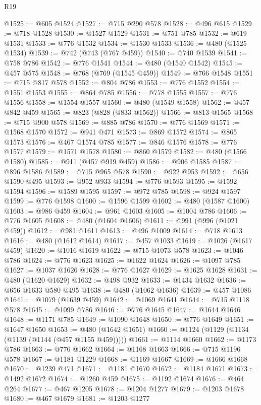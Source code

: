 \begin{lexlean}{R19}
\begin{coremodule}
@1525 := @605 @1524
@1527 := @715 @290 @578
@1528 := @496 @615
@1529 := @718 @1528
@1530 := @1527 @1529
@1531 := @751 @785
@1532 := @619 @1531
@1533 := @776 @1532
@1534 := @1530 @1533
@1536 := @480 (@1525 @1534)
@1539 := @742 (@743 (@767 @459))
@1540 := @740 @1539
@1541 := @758 @786
@1542 := @776 @1541
@1544 := @480 (@1540 @1542)
@1545 := @457 @575
@1548 := @768 (@769 (@1545 @459))
@1549 := @766 @1548
@1551 := @715 @817 @578
@1552 := @804 @786
@1553 := @776 @1552
@1554 := @1551 @1553
@1555 := @864 @785
@1556 := @778 @1555
@1557 := @776 @1556
@1558 := @1554 @1557
@1560 := @480 (@1549 @1558)
@1562 := @457 @842 @459
@1565 := @823 (@828 (@833 @1562))
@1566 := @813 @1565
@1568 := @715 @900 @578
@1569 := @885 @786
@1570 := @776 @1569
@1571 := @1568 @1570
@1572 := @941 @471
@1573 := @869 @1572
@1574 := @865 @1573
@1576 := @467 @1574 @785
@1577 := @846 @1576
@1578 := @776 @1577
@1579 := @1571 @1578
@1580 := @860 @1579
@1582 := @480 (@1566 @1580)
@1585 := @911 (@457 @919 @459)
@1586 := @906 @1585
@1587 := @896 @1586
@1589 := @715 @965 @578
@1590 := @922 @953
@1592 := @656 @1590 @495
@1593 := @952 @933
@1594 := @776 @1593
@1595 := @1592 @1594
@1596 := @1589 @1595
@1597 := @972 @785
@1598 := @924 @1597
@1599 := @776 @1598
@1600 := @1596 @1599
@1602 := @480 (@1587 @1600)
@1603 := @986 @459
@1604 := @961 @1603
@1605 := @1004 @786
@1606 := @776 @1605
@1608 := @480 (@1604 @1606)
@1611 := @991 (@996 (@1021 @459))
@1612 := @981 @1611
@1613 := @496 @1009
@1614 := @718 @1613
@1616 := @480 (@1612 @1614)
@1617 := @457 @1033
@1619 := @1026 (@1617 @459)
@1620 := @1016 @1619
@1622 := @715 @1073 @578
@1623 := @1046 @786
@1624 := @776 @1623
@1625 := @1622 @1624
@1626 := @1097 @785
@1627 := @1037 @1626
@1628 := @776 @1627
@1629 := @1625 @1628
@1631 := @480 (@1620 @1629)
@1632 := @498 @932
@1633 := @1434 @1632
@1636 := @656 @1633 @580 @495
@1638 := @480 (@1062 @1636)
@1639 := @457 @1086
@1641 := @1079 (@1639 @459)
@1642 := @1069 @1641
@1644 := @715 @1118 @578
@1645 := @1099 @786
@1646 := @776 @1645
@1647 := @1644 @1646
@1648 := @1171 @785
@1649 := @1090 @1648
@1650 := @776 @1649
@1651 := @1647 @1650
@1653 := @480 (@1642 @1651)
@1660 := @1124 (@1129 (@1134 (@1139 (@1144 (@457 @1155 @459)))))
@1661 := @1114 @1660
@1662 := @1173 @786
@1663 := @776 @1662
@1664 := @1168 @1663
@1666 := @715 @1196 @578
@1667 := @1181 @1229
@1668 := @1169 @1667
@1669 := @1666 @1668
@1670 := @1239 @471
@1671 := @1181 @1670
@1672 := @1184 @1671
@1673 := @1492 @1672
@1674 := @1260 @459
@1675 := @1192 @1674
@1676 := @464 @264
@1677 := @467 @1205
@1678 := @1204 @1277
@1679 := @1203 @1678
@1680 := @467 @1679
@1681 := @1203 @1277

\end{coremodule}
\end{lexlean}
